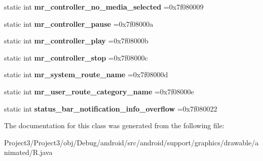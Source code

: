 \begin{DoxyCompactItemize}
\mbox{\label{classandroid_1_1support_1_1graphics_1_1drawable_1_1animated_1_1R_1_1string_acf2c9bed9719b9d07010444f6c4284b5}} 
static int {\bfseries mr\+\_\+controller\+\_\+no\+\_\+media\+\_\+selected} =0x7f080009
\item 
\mbox{\label{classandroid_1_1support_1_1graphics_1_1drawable_1_1animated_1_1R_1_1string_ad7ddade12dcaa03b094ba1250edb974a}} 
static int {\bfseries mr\+\_\+controller\+\_\+pause} =0x7f08000a
\item 
\mbox{\label{classandroid_1_1support_1_1graphics_1_1drawable_1_1animated_1_1R_1_1string_ad5126a6881cbcb5f40be7bfdb5b8c2d8}} 
static int {\bfseries mr\+\_\+controller\+\_\+play} =0x7f08000b
\item 
\mbox{\label{classandroid_1_1support_1_1graphics_1_1drawable_1_1animated_1_1R_1_1string_a776c8fa3b37d6757dcf8088abfac8a59}} 
static int {\bfseries mr\+\_\+controller\+\_\+stop} =0x7f08000c
\item 
\mbox{\label{classandroid_1_1support_1_1graphics_1_1drawable_1_1animated_1_1R_1_1string_a635901c2cc43db52c85842e10c55bcb0}} 
static int {\bfseries mr\+\_\+system\+\_\+route\+\_\+name} =0x7f08000d
\item 
\mbox{\label{classandroid_1_1support_1_1graphics_1_1drawable_1_1animated_1_1R_1_1string_a709aebf5898a59a402e4be6e700d2b89}} 
static int {\bfseries mr\+\_\+user\+\_\+route\+\_\+category\+\_\+name} =0x7f08000e
\item 
\mbox{\label{classandroid_1_1support_1_1graphics_1_1drawable_1_1animated_1_1R_1_1string_afd7d76f683c51cfc58eef8fc8d517b11}} 
static int {\bfseries status\+\_\+bar\+\_\+notification\+\_\+info\+\_\+overflow} =0x7f080022
\end{DoxyCompactItemize}


The documentation for this class was generated from the following file\+:\begin{DoxyCompactItemize}
\item 
Project3/\+Project3/obj/\+Debug/android/src/android/support/graphics/drawable/animated/R.\+java\end{DoxyCompactItemize}
